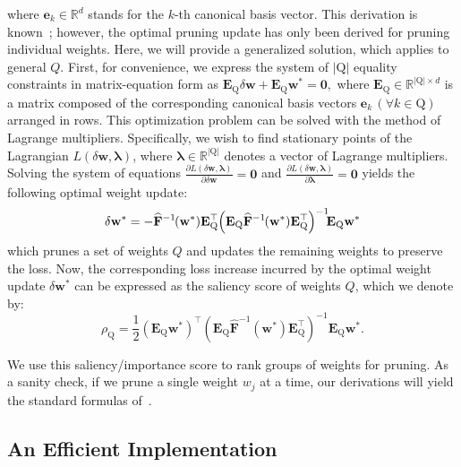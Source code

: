 \documentclass[11pt]{article}
\newcommand{\vect}[1]{\mathbf{#1}}
\newcommand{\ws}{\vect{w}^*}
\newcommand{\w}{\mathbf{w}}
\newcommand{\pr}[1]{\left(#1\right)}
\newcommand{\dw}{\delta \w}
\newcommand{\eF}{\widehat{\vect{F}}}
\newcommand{\e}{\vect{e}}
\newcommand{\E}{\vect{E}}
\newcommand{\subQ}{\textrm{Q}}
\begin{document}
\noindent where \( \e_k \in \mathbb{R}^d \) stands for the \( k \)-th canonical basis vector. This derivation is known~\cite{hassibi1993second}; however, the optimal pruning update has only been derived for pruning individual weights. Here, we will provide a generalized solution, which applies to general $Q$. 
First, for convenience, we express the system of \( |\textrm{Q}| \) equality constraints in matrix-equation form as
\(    \E_\subQ \dw + \E_\subQ\ws = \vect{0}, \)
 where \( \E_\subQ \in \mathbb{R}^{|\subQ| \times d} \) is a matrix composed of the corresponding canonical basis vectors \( \e_k\, (\forall k \in \subQ) \) arranged in rows. This optimization problem can be solved with the method of Lagrange multipliers. Specifically, we wish to find stationary points of the Lagrangian \( L(\dw, \boldsymbol{\lambda}) \), where \( \boldsymbol{\lambda} \in \mathbb{R}^{|\subQ|} \) denotes a vector of Lagrange multipliers. Solving the system of equations 
\(
    \frac{\partial L(\dw, \boldsymbol{\lambda})}{\partial \dw} = \vect{0} \) and 
\(    \frac{\partial L(\dw, \boldsymbol{\lambda})}{\partial \boldsymbol{\lambda}} = \vect{0} \)
yields the following optimal weight update:
\begin{equation*}
\label{eq:update}
    \dw^* = -\eF^{-1}\hspace*{-.1em}(\ws)\E_\subQ^\top\hspace*{-.2em}\pr{\E_\subQ \eF^{-1}\hspace*{-.1em}(\ws) \E_\subQ^\top}^{-1}\hspace*{-.4em}\E_\subQ \ws 
\end{equation*}
which prunes a set of weights $Q$ and updates the remaining weights to preserve the loss.
Now, the corresponding loss increase incurred by the optimal weight update \( \dw^* \) can be expressed as the saliency score of weights $Q$, which we denote by:
\begin{equation*}
\label{eq:saliency}
    \rho_\subQ = \frac{1}{2} \pr{\E_\subQ \w^*}^\top \pr{\E_\subQ \eF^{-1}(\ws)\E_\subQ^\top}^{-1} \E_\subQ \w^*.
\end{equation*}

We use this saliency/importance score to rank groups of weights for pruning. As a sanity check, if we prune a single weight $w_j$ at a time, our derivations will yield the standard formulas of~\cite{hassibi1993second, Singh2020WoodFisherES}.

\subsection{An Efficient Implementation}
\end{document}
